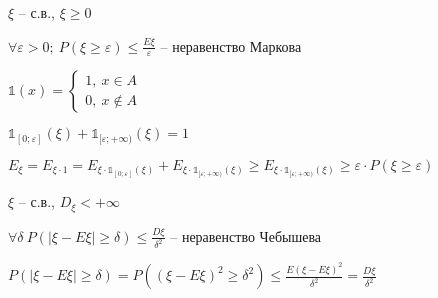 \documentclass[14pt, letter paper]{article}
\begin{document}
$\xi$ -- с.в., $\xi \geq 0$

$\forall \varepsilon > 0;\ P(\xi \geq \varepsilon) \leq \frac{E\xi}{\varepsilon}$ -- неравенство Маркова

$\mathbb{1}(x) = \left\{ \begin{gathered}
    1,\ x \in A \\
    0,\ x \not\in A
\end{gathered} \right.$

$\mathbb{1}_{[0; \varepsilon]}(\xi) + \mathbb{1}_{[\varepsilon; +\infty)}(\xi) = 1$

$E_\xi = E_{\xi \cdot 1} = E_{\xi \cdot \mathbb{1}_{[0; \varepsilon]}(\xi)} + E_{\xi \cdot \mathbb{1}_{[\varepsilon; +\infty)}(\xi)} \geq E_{\xi \cdot \mathbb{1}_{[\varepsilon; +\infty)}(\xi)} \geq \varepsilon \cdot P(\xi \geq \varepsilon)$

$\xi$ -- с.в., $D_\xi < +\infty$

$\forall \delta\ P(|\xi - E\xi| \geq \delta) \leq \frac{D\xi}{\delta^2}$ -- неравенство Чебышева

$P(|\xi - E\xi| \geq \delta) = P((\xi - E\xi)^2 \geq \delta^2) \leq \frac{E(\xi - E\xi)^2}{\delta^2} = \frac{D\xi}{\delta^2}$ 
\end{document}
